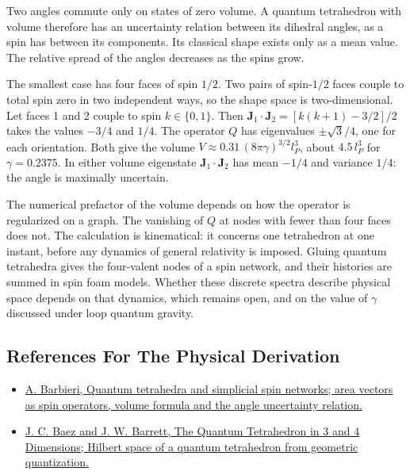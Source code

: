 \documentclass[11pt,oneside]{book}
\begin{document}
Two angles commute only on states of zero volume. A quantum tetrahedron with volume therefore has an uncertainty relation between its dihedral angles, as a spin has between its components. Its classical shape exists only as a mean value. The relative spread of the angles decreases as the spins grow.

The smallest case has four faces of spin \(1/2\). Two pairs of spin-\(1/2\) faces couple to total spin zero in two independent ways, so the shape space is two-dimensional. Let faces 1 and 2 couple to spin \(k\in\{0,1\}\). Then \(\mathbf J_1\cdot\mathbf J_2=[k(k+1)-3/2]/2\) takes the values \(-3/4\) and \(1/4\). The operator \(Q\) has eigenvalues \(\pm\sqrt3/4\), one for each orientation. Both give the volume \(V\approx0.31\,(8\pi\gamma)^{3/2}l_P^3\), about \(4.5\,l_P^3\) for \(\gamma=0.2375\). In either volume eigenstate \(\mathbf J_1\cdot\mathbf J_2\) has mean \(-1/4\) and variance \(1/4\): the angle is maximally uncertain.

The numerical prefactor of the volume depends on how the operator is regularized on a graph. The vanishing of \(Q\) at nodes with fewer than four faces does not. The calculation is kinematical: it concerns one tetrahedron at one instant, before any dynamics of general relativity is imposed. Gluing quantum tetrahedra gives the four-valent nodes of a spin network, and their histories are summed in spin foam models. Whether these discrete spectra describe physical space depends on that dynamics, which remains open, and on the value of \(\gamma\) discussed under loop quantum gravity.

\subsection*{References For The Physical Derivation}
\begin{itemize}
\item \href{https://arxiv.org/abs/gr-qc/9707010}{A. Barbieri, Quantum tetrahedra and simplicial spin networks; area vectors as spin operators, volume formula and the angle uncertainty relation.}
\item \href{https://arxiv.org/abs/gr-qc/9903060}{J. C. Baez and J. W. Barrett, The Quantum Tetrahedron in 3 and 4 Dimensions; Hilbert space of a quantum tetrahedron from geometric quantization.}
\end{itemize}





\clearpage
\end{document}
